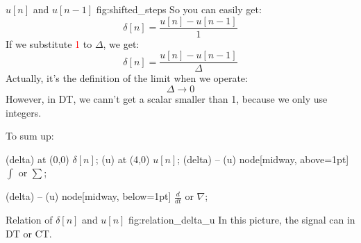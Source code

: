                 {$u[n]$ and $u[n-1]$}
                {fig:shifted_steps}
        So you can easily get:
            \begin{equation}
                \delta[n] = \frac{u[n] - u[n-1]}{1}
            \end{equation}
        If we substitute \textcolor{red}{1} to $\Delta$, we get:
            \begin{equation}
                \delta[n] = \frac{u[n] - u[n-1]}{\Delta}
            \end{equation}
        Actually, it's the definition of the limit when we operate:
            \begin{equation}
                \Delta \rightarrow 0
            \end{equation}
        However, in DT, we cann't get a scalar smaller than 1, because we only use integers.

        To sum up:
            \inserttikzpicture
                {
            
                 (delta) at (0,0) {$\delta[n]$};
                 (u) at (4,0) {$u[n]$}; 
                \draw[
                    ->,               %
                    thick,            %
                    shorten <=2pt,    
                    shorten >=2pt,
                    transform canvas={yshift=2.5pt}     
                ] 
                    (delta) -- (u) %
                    node[midway, above=1pt] {$\int$ or $\sum$};
                
                \draw[
                    <-,               %
                    thick,            %
                    shorten <=2pt,    
                    shorten >=2pt,
                    transform canvas={yshift=-2.5pt}     
                ] 
                (delta) -- (u) %
                node[midway, below=1pt] {$\frac{d}{dt}$ or $\nabla$};
                }
                {Relation of $\delta[n]$ and $u[n]$}
                {fig:relation_delta_u}
        \noindent In this picture, the signal can in DT or CT.

        

        


        
        

        
        
                        
        
        
        








        
        

        
        

        


        